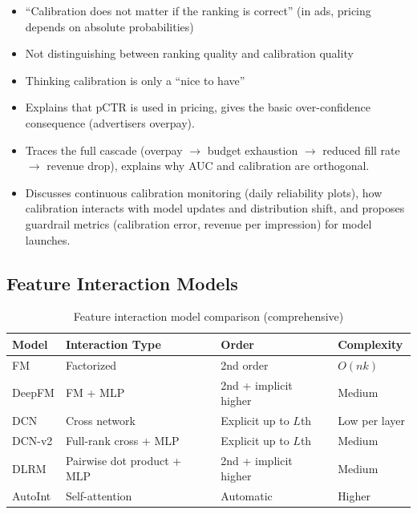 \begin{interviewq}
\redflags
\begin{itemize}
    \item ``Calibration does not matter if the ranking is correct'' (in ads, pricing depends on absolute probabilities)
    \item Not distinguishing between ranking quality and calibration quality
    \item Thinking calibration is only a ``nice to have''
\end{itemize}


\goodgreat
\begin{itemize}
    \item {} Explains that pCTR is used in pricing, gives the basic over-confidence consequence (advertisers overpay).
    \item {} Traces the full cascade (overpay $\rightarrow$ budget exhaustion $\rightarrow$ reduced fill rate $\rightarrow$ revenue drop), explains why AUC and calibration are orthogonal.
    \item {} Discusses continuous calibration monitoring (daily reliability plots), how calibration interacts with model updates and distribution shift, and proposes guardrail metrics (calibration error, revenue per impression) for model launches.
\end{itemize}

\end{interviewq}

\subsection{Feature Interaction Models}

\begin{table}[H]
\centering
\caption{Feature interaction model comparison (comprehensive)}
\begin{tabularx}{\textwidth}{lXXX}
\toprule
\textbf{Model} & \textbf{Interaction Type} & \textbf{Order} & \textbf{Complexity} \\
\midrule
FM & Factorized & 2nd order & $O(nk)$ \\
DeepFM & FM + MLP & 2nd + implicit higher & Medium \\
DCN & Cross network & Explicit up to $L$th & Low per layer \\
DCN-v2 & Full-rank cross + MLP & Explicit up to $L$th & Medium \\
DLRM & Pairwise dot product + MLP & 2nd + implicit higher & Medium \\
AutoInt & Self-attention & Automatic & Higher \\
\bottomrule
\end{tabularx}
\end{table}
